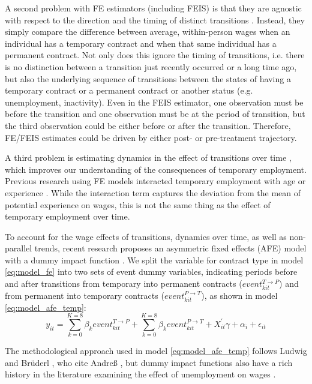\documentclass[12pt]{article}
\begin{document}
A second problem with FE estimators (including FEIS) is that they are agnostic with respect to the direction and the timing of distinct transitions \citep{allison_using_1994}.  Instead, they simply compare the difference between average, within-person wages when an individual has a temporary contract and when that same individual has a permanent contract.  Not only does this ignore the timing of transitions, i.e. there is no distinction between a transition just recently occurred or a long time ago, but also the underlying sequence of transitions between the states of having a temporary contract or a permanent contract or another status (e.g. unemployment, inactivity).  Even in the FEIS estimator, one observation must be before the transition and one observation must be at the period of transition, but the third observation could be either before or after the transition.  Therefore, FE/FEIS estimates could be driven by either post- or pre-treatment trajectory.

A third problem is estimating dynamics in the effect of transitions over time \citep{andres_applied_2013}, which improves our understanding of the consequences of temporary employment.  Previous research using FE models interacted temporary employment with age or experience \citep{booth_temporary_2002,mooi-reci_casual_2017}.  While the interaction term captures the deviation from the mean of potential experience on wages, this is not the same thing as the effect of temporary employment over time.  

To account for the wage effects of transitions, dynamics over time, as well as non-parallel trends, recent research proposes an asymmetric fixed effects (AFE) model with a dummy impact function \citep{allison_asymmetric_2019,andres_applied_2013,ludwig_what_2021}.  We split the variable for contract type in model \ref{eq:model_fe} into two sets of event dummy variables, indicating periods before and after transitions from temporary into permanent contracts ($event^{T \rightarrow P}_{kit}$) and from permanent into temporary contracts ($event^{P \rightarrow T}_{kit}$), as shown in model \ref{eq:model_afe_temp}: 
\begin{equation}
    y_{it} = \sum^{K=8}_{k=0} \beta_k event^{T \rightarrow P}_{kit} + \sum^{K=8}_{k=0} \beta_k event^{P \rightarrow T}_{kit} + X^\prime_{it} \gamma + \alpha_i + \epsilon_{it}     
    \label{eq:model_afe_temp} 
\end{equation}

The methodological approach used in model \ref{eq:model_afe_temp} follows Ludwig and Brüderl \citeyearpar{ludwig_what_2021}, who cite Andreß \citeyearpar{andres_applied_2013}, but dummy impact functions also have a rich history in the literature examining the effect of unemployment on wages \citep{jacobson_earnings_1993,stevens_persistent_1997}. 
\end{document}
